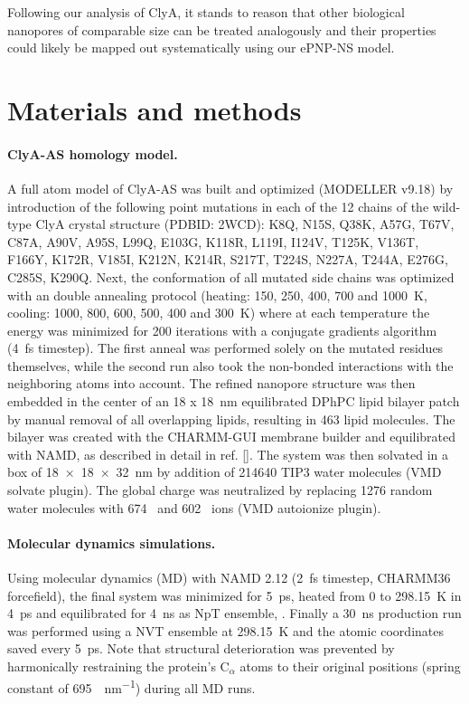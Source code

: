 \documentclass[journal=ancac3,manuscript=article,etalmode=truncate,maxauthors=0,layout=twocolumn]{achemso}
\begin{document}
Following our analysis of ClyA, it stands to reason that other biological nanopores of comparable size can be
treated analogously and their properties could likely be mapped out systematically using our ePNP-NS model.


\section{Materials and methods}\label{sec:methods}

\paragraph{ClyA-AS homology model.} A full atom model of ClyA-AS\cite{Soskine-2013} was built and optimized
(MODELLER v9.18\cite{Sali-1993}) by introduction of the following point mutations in each of the 12 chains of
the wild-type ClyA crystal structure (PDBID: 2WCD\cite{Mueller-2009}): K8Q, N15S, Q38K, A57G, T67V, C87A,
A90V, A95S, L99Q, E103G, K118R, L119I, I124V, T125K, V136T, F166Y, K172R, V185I, K212N, K214R, S217T, T224S,
N227A, T244A, E276G, C285S, K290Q. Next, the conformation of all mutated side chains was optimized with an
double annealing protocol (heating: 150, 250, 400, 700 and \SI{1000}{\kelvin}, cooling: 1000, 800, 600, 500,
400 and \SI{300}{\kelvin}) where at each temperature the energy was minimized for 200 iterations with a
conjugate gradients algorithm (\SI{4}{\fs} timestep).\cite{Shanno-1980} The first anneal was performed solely
on the mutated residues themselves, while the second run also took the non-bonded interactions with the
neighboring atoms into account. The refined nanopore structure was then embedded in the center of an \SI{18 x
18}{\nm} equilibrated DPhPC lipid bilayer patch by manual removal of all overlapping lipids, resulting in 463
lipid molecules. The bilayer was created with the CHARMM-GUI\cite{Jo-2008} membrane builder\cite{Lee-2016} and
equilibrated with NAMD\cite{Phillips-2005}, as described in detail in ref. []. The system was
then solvated in a box of \SI{18 x 18 x 32}{\nm} by addition of 214640 TIP3 water molecules (VMD solvate
plugin). The global charge was neutralized by replacing 1276 random water molecules with 674 \Na\ and 602 \Cl\
ions (VMD autoionize plugin).\cite{Humphrey-1996}

\paragraph{Molecular dynamics simulations.} Using molecular dynamics (MD) with NAMD 2.12 (\SI{2}{\fs}
timestep, CHARMM36 forcefield\cite{Best-2012}), the final system was minimized for \SI{5}{\ps}, heated from 0
to \SI{298.15}{\kelvin} in \SI{4}{\ps} and equilibrated for \SI{4}{\ns} as NpT
ensemble, .\cite{Aksimentiev-2005} Finally a \SI{30}{\ns} production run was performed using a NVT ensemble at
\SI{298.15}{\kelvin} and the atomic coordinates saved every \SI{5}{\ps}. Note that structural deterioration
was prevented by harmonically restraining the protein's C$_\alpha$ atoms to their original positions (spring
constant of \SI{695}{\pN\per\nm}) during all MD runs.\cite{Bhattacharya-2011}
\end{document}
